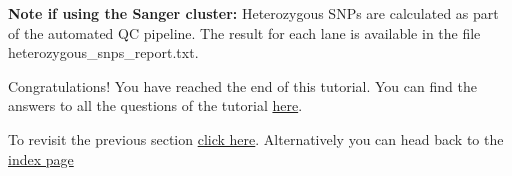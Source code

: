\documentclass[11pt]{article}
\begin{document}
\textbf{Note if using the Sanger cluster:} Heterozygous SNPs are
calculated as part of the automated QC pipeline. The result for each
lane is available in the file heterozygous\_snps\_report.txt.

Congratulations! You have reached the end of this tutorial. You can find
the answers to all the questions of the tutorial
\href{contamination-answers.ipynb}{here}.

To revisit the previous section \href{assessment.ipynb}{click here}.
Alternatively you can head back to the \href{index.ipynb}{index page}


\end{document}
